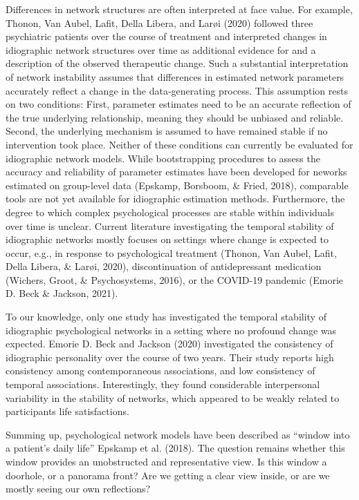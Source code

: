 \documentclass[
  english,
  man]{apa6}
\begin{document}
Differences in network structures are often interpreted at face value.
For example, Thonon, Van Aubel, Lafit, Della Libera, and Larøi (2020) followed three psychiatric patients over the course of treatment and interpreted changes in idiographic network structures over time as additional evidence for and a description of the observed therapeutic change.
Such a substantial interpretation of network instability assumes that differences in estimated network parameters accurately reflect a change in the data-generating process.
This assumption rests on two conditions: First, parameter estimates need to be an accurate reflection of the true underlying relationship, meaning they should be unbiased and reliable.
Second, the underlying mechanism is assumed to have remained stable if no intervention took place.
Neither of these conditions can currently be evaluated for idiographic network models.
While bootstrapping procedures to assess the accuracy and reliability of parameter estimates have been developed for neworks estimated on group-level data (Epskamp, Borsboom, \& Fried, 2018), comparable tools are not yet available for idiographic estimation methods.
Furthermore, the degree to which complex psychological processes are stable within individuals over time is unclear.
Current literature investigating the temporal stability of idiographic networks mostly focuses on settings where change is expected to occur, e.g., in response to psychological treatment (Thonon, Van Aubel, Lafit, Della Libera, \& Larøi, 2020), discontinuation of antidepressant medication (Wichers, Groot, \& Psychosystems, 2016), or the COVID-19 pandemic (Emorie D. Beck \& Jackson, 2021).

To our knowledge, only one study has investigated the temporal stability of idiographic psychological networks in a setting where no profound change was expected.
Emorie D. Beck and Jackson (2020) investigated the consistency of idiographic personality over the course of two years.
Their study reports high consistency among contemporaneous associations, and low consistency of temporal associations.
Interestingly, they found considerable interpersonal variability in the stability of networks, which appeared to be weakly related to participants life satisfactions.

Summing up, psychological network models have been described as ``window into a patient's daily life'' Epskamp et al. (2018).
The question remains whether this window provides an unobstructed and representative view.
Is this window a doorhole, or a panorama front?
Are we getting a clear view inside, or are we mostly seeing our own reflections?
\end{document}
